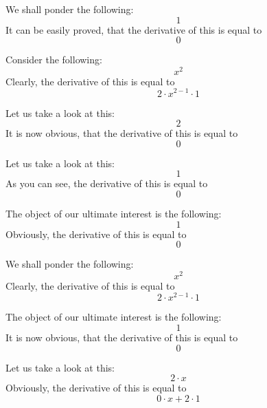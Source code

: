 \documentclass{article}
\begin{document}
We shall ponder the following:
\begin{equation}
1 
\end{equation}
It can be easily proved, that the derivative of this is equal to
\begin{equation}
0 
\end{equation}

Consider the following:
\begin{equation}
x ^{2 } 
\end{equation}
Clearly, the derivative of this is equal to
\begin{equation}
2 \cdot x ^{2 - 1 } \cdot 1 
\end{equation}

Let us take a look at this:
\begin{equation}
2 
\end{equation}
It is now obvious, that the derivative of this is equal to
\begin{equation}
0 
\end{equation}

Let us take a look at this:
\begin{equation}
1 
\end{equation}
As you can see, the derivative of this is equal to
\begin{equation}
0 
\end{equation}

The object of our ultimate interest is the following:
\begin{equation}
1 
\end{equation}
Obviously, the derivative of this is equal to
\begin{equation}
0 
\end{equation}

We shall ponder the following:
\begin{equation}
x ^{2 } 
\end{equation}
Clearly, the derivative of this is equal to
\begin{equation}
2 \cdot x ^{2 - 1 } \cdot 1 
\end{equation}

The object of our ultimate interest is the following:
\begin{equation}
1 
\end{equation}
It is now obvious, that the derivative of this is equal to
\begin{equation}
0 
\end{equation}

Let us take a look at this:
\begin{equation}
2 \cdot x 
\end{equation}
Obviously, the derivative of this is equal to
\begin{equation}
0 \cdot x + 2 \cdot 1 
\end{equation}
\end{document}
